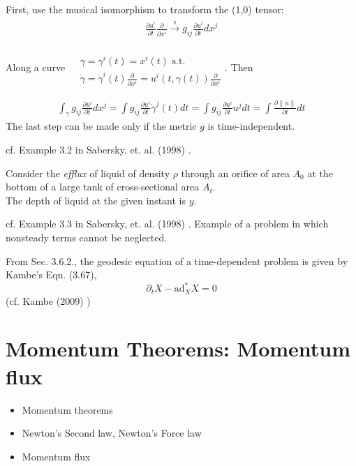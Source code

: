 \documentclass[twoside,landscape,10pt]{amsart}
\theoremstyle{plain}
\theoremstyle{definition}
\theoremstyle{remark}
\theoremstyle{remark}
\begin{document}
\begin{multicols*}{2}
First, use the musical isomorphism to transform the (1,0) tensor:
\[
\begin{gathered}
\frac{ \partial u^i}{\partial t}\frac{\partial}{\partial x^i} \xrightarrow{\flat} g_{ij} \frac{\partial u^i}{\partial t} dx^j
\end{gathered}
\]

Along a curve $\begin{aligned} & \quad \\ 
& \gamma = \gamma^i(t) = x^i(t) \text{ s.t. } \\
& \dot{\gamma} = \dot{\gamma}^i(t) \frac{ \partial}{\partial x^i} = u^i(t, \gamma(t)) \frac{\partial}{\partial x^i}
\end{aligned}$. Then

\[
\begin{gathered}
\int_{\gamma} g_{ij} \frac{\partial u^i}{\partial t} dx^j = \int g_{ij} \frac{\partial u^i}{\partial t} \dot{\gamma}^j(t) dt = \int g_{ij} \frac{\partial u^i}{\partial t} u^j dt = \int \frac{\partial \| u \| }{ \partial t} dt 
\end{gathered}
\]
The last step can be made only if the metric $g$ is time-independent.


cf. Example 3.2 in Sabersky, et. al. (1998) \cite{SAHG1998}. 

Consider the \emph{efflux} of liquid of density $\rho$ through an orifice of area $A_0$ at the bottom of a large tank of cross-sectional area $A_t$. \\
The depth of liquid at the given instant is $y$.


cf. Example 3.3 in Sabersky, et. al. (1998) \cite{SAHG1998}. Example of a problem in which nonsteady terms cannot be neglected. 




From Sec. 3.6.2., the geodesic equation of a time-dependent problem is given by Kambe's Eqn. (3.67), 
\[
\partial_tX - \text{ad}^*_XX = 0 
\]
(cf. Kambe (2009) \cite{TKambe2009})


\section{Momentum Theorems: Momentum flux}

\begin{itemize}
  \item Momentum theorems
  \item Newton's Second law, Newton's Force law
  \item Momentum flux
\end{itemize}


\end{multicols*}
\end{document}
